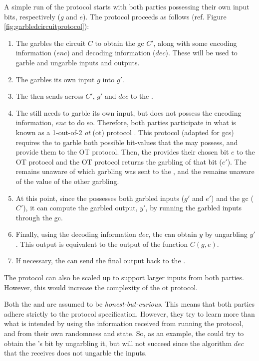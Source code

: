 A simple run of the protocol starts with both parties possessing their own input bits, respectively ($g$ and $e$). The protocol proceeds as follows (ref. Figure \ref{fig:garbledcircuitprotocol}):
\begin{enumerate}
    \item The \cgarbler garbles the circuit $C$ to obtain the \acrlong{gc} $C'$, along with some encoding information ($enc$) and decoding information ($dec$). These will be used to garble and ungarble inputs and outputs.
    \item The \cgarbler garbles its own input $g$ into $g'$.
    \item The \cgarbler then sends across $C'$, $g'$ and $dec$ to the \cevaluator.
    \item The \cevaluator still needs to garble its own input, but does not possess the encoding information, $enc$ to do so. Therefore, both parties participate in what is known as a 1-out-of-2 \textit{\acrlong{ot}} (\acrshort{ot}) protocol \cite{C:EveGolLem82}. This protocol (adapted for \acrshort{gc}s) requires the \cgarbler to garble both possible bit-values that the \cevaluator may possess, and provide them to the OT protocol. Then, the \cevaluator provides their chosen bit $e$ to the OT protocol and the OT protocol returns the garbling of that bit ($e'$). The \cgarbler remains unaware of which garbling was sent to the \cevaluator, and the \cevaluator remains unaware of the value of the other garbling.
    \item At this point, since the \cevaluator possesses both garbled inputs ($g'$ and $e'$) and the \acrlong{gc} ($C'$), it can compute the garbled output, $y'$, by running the garbled inputs through the \acrlong{gc}.  
    \item Finally, using the decoding information $dec$, the \cevaluator can obtain $y$ by ungarbling $y'$. This output is equivalent to the output of the function $C(g,e)$.
    \item If necessary, the \cevaluator can send the final output back to the \cgarbler.
\end{enumerate}
The protocol can also be scaled up to support larger inputs from both parties. However, this would increase the complexity of the \acrlong{ot} protocol.

Both the \cgarbler and \cevaluator are assumed to be \textit{honest-but-curious}.  
This means that both parties adhere strictly to the protocol specification. However, they try to learn more than what is intended by using the information received from running the protocol, and from their own randomness and state. So, as an example, the \cevaluator could try to obtain the \cgarbler's bit by ungarbling it, but will not succeed since the algorithm $dec$ that the \cevaluator receives does not ungarble the inputs.

